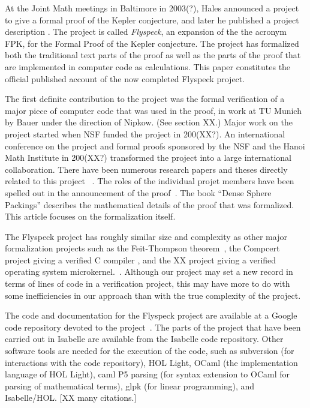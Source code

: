 At the Joint Math meetings in Baltimore in 2003(?), Hales announced a
project to give a formal proof of the Kepler conjecture, and later he
published a project description \cite{MAPS XX}.
The project is called {\it Flyspeck}, an expansion of the the acronym
FPK, for the Formal Proof of the Kepler conjecture.  The project has
formalized both the traditional text parts of the proof as well as the
parts of the proof that are implemented in computer code as
calculations.  This paper constitutes the official published account
of the now completed Flyspeck project.

The first definite contribution to the project was the formal
verification of a major piece of computer code that was used in the
proof, in work at TU Munich by Bauer under the direction of
Nipkow. (See section XX.)  Major work on the project started when NSF
funded the project in 200(XX?).  An international conference on the
project and formal proofs sponsored by the NSF and the Hanoi Math
Institute in 200(XX?) transformed the project into a large
international collaboration.  There have been numerous research papers
and theses directly related to this project ~\cite{XX}.  The roles of
the individual projet members have been spelled out in the
announcement of the proof~\cite{XX}.  The book ``Dense Sphere
Packings'' describes the mathematical details of the proof that was
formalized.  This article focuses on the formalization itself.

The Flyspeck project has roughly similar size and complexity as other
major formalization projects such as the Feit-Thompson
theorem~\cite{XX}, the Compcert project giving a verified C compiler
\cite{XX}, and the XX project giving a verified operating system
microkernel.~\cite{XX}.  Although our project may set a new record in
terms of lines of code in a verification project, this may have more
to do with some inefficiencies in our approach than with the true
complexity of the project.

The code and documentation for the Flyspeck project are available at
a Google code repository devoted to the project~\cite{XX}.  The
parts of the project that have been carried out in Isabelle are
available from the Isabelle code repository.  Other software tools are
needed for the execution of the code, such as subversion (for
interactions with the code repository), HOL Light, OCaml (the
implementation language of HOL Light), caml P5 parsing (for syntax
extension to OCaml for parsing of mathematical terms), glpk (for
linear programming), and Isabelle/HOL. [XX many citations.]

